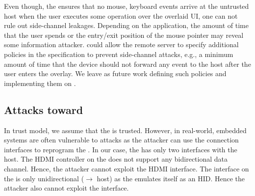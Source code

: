  Even though, the \device ensures that no mouse, keyboard events arrive at the untrusted host when the user executes some operation over the overlaid UI, one can not rule out side-channel leakages. Depending on the application, the amount of time that the user spends or the entry/exit position of the mouse pointer may reveal some information attacker. 
\device could allow the remote server to specify additional policies in the specification to prevent side-channel attacks, e.g., a minimum amount of time that the device should not forward any event to the host after the user enters the overlay. We leave as future work defining such policies and implementing them on \name.


\subsection{Attacks toward \device}

In \name trust model, we assume that the \device is trusted. However, in real-world, embedded systems are often vulnerable to attacks as the attacker can use the connection interfaces to reprogram the \device. In our case, the \device has only two interfaces with the host. The HDMI controller on the \device does not support any bidirectional data channel. Hence, the attacker cannot exploit the HDMI interface. The \usb interface on the \device is only unidirectional (\device $\rightarrow$ host) as the \device emulates itself as an HID. Hence the attacker also cannot exploit the \usb interface.  
